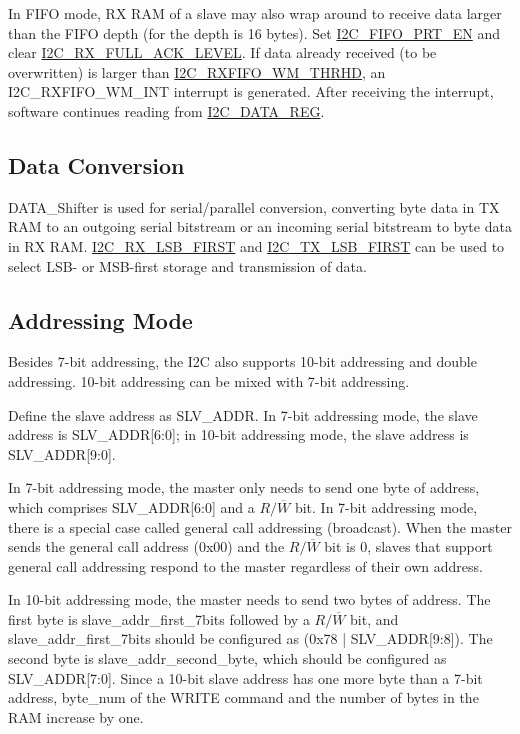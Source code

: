 \documentclass[main\_\_EN.tex]{subfiles}
\begin{document}
In FIFO mode, RX RAM of a slave may also wrap around to receive data larger than  the FIFO depth (for \chipname{} the depth is 16 bytes). Set \hyperref[fielddesc:I2CFIFOPRTEN]{I2C\_FIFO\_PRT\_EN} and clear \hyperref[fielddesc:I2CRXFULLACKLEVEL]{I2C\_RX\_FULL\_ACK\_LEVEL}. If data already received (to be overwritten) is larger than \hyperref[fielddesc:I2CRXFIFOWMTHRHD]{I2C\_RXFIFO\_WM\_THRHD}, an I2C\_RXFIFO\_WM\_INT interrupt is generated. After receiving the interrupt, software continues reading from \hyperref[regdesc:I2CDATAREG]{I2C\_DATA\_REG}.

\subsection{Data Conversion}
DATA\_Shifter is used for serial/parallel conversion, converting byte data in TX RAM to an outgoing serial bitstream or an incoming serial bitstream to byte data in RX RAM. \hyperref[fielddesc:I2CRXLSBFIRST]{I2C\_RX\_LSB\_FIRST} and \hyperref[fielddesc:I2CTXLSBFIRST]{I2C\_TX\_LSB\_FIRST} can be used to select LSB- or MSB-first storage and transmission of data.

\subsection{Addressing Mode}
Besides 7-bit addressing, the \chipname{} I2C also supports 10-bit addressing and double addressing. 10-bit addressing can be mixed with 7-bit addressing.

Define the slave address as SLV\_ADDR. In 7-bit addressing mode, the slave address is SLV\_ADDR[6:0]; in 10-bit addressing mode, the slave address is SLV\_ADDR[9:0].

In 7-bit addressing mode, the master only needs to send one byte of address, which comprises SLV\_ADDR[6:0] and a $R/\overline W$ bit. In 7-bit addressing mode, there is a special case called general call addressing (broadcast). When the master sends the general call address (0x00) and the $R/\overline W$ bit is 0, slaves that support general call addressing respond to the master regardless of their own address.

In 10-bit addressing mode, the master needs to send two bytes of address. The first byte is slave\_addr\_first\_7bits followed by a $R/\overline W$ bit, and slave\_addr\_first\_7bits should be configured as (0x78 | SLV\_ADDR[9:8]). The second byte is slave\_addr\_second\_byte, which should be configured as SLV\_ADDR[7:0]. Since a 10-bit slave address has one more byte than a 7-bit address, byte\_num of the WRITE command and the number of bytes in the RAM increase by one.
\end{document}
